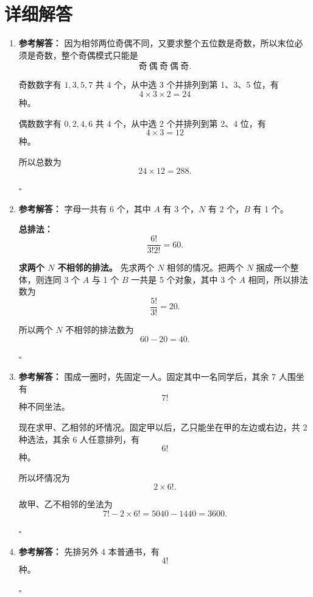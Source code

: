 \documentclass[11pt,a4paper,fontset=fandol]{ctexart}
\newenvironment{solution}{\par\noindent\textbf{参考解答：}}{\hfill$\square$\par}
\begin{document}
\newpage
\section{详细解答}

\begin{enumerate}
  \item \begin{solution}
  因为相邻两位奇偶不同，又要求整个五位数是奇数，所以末位必须是奇数，整个奇偶模式只能是
  \[
  \text{奇}\ \text{偶}\ \text{奇}\ \text{偶}\ \text{奇}.
  \]

  奇数数字有 $1,3,5,7$ 共 4 个，从中选 3 个并排列到第 1、3、5 位，有
  \[
  4\times 3\times 2=24
  \]
  种。

  偶数数字有 $0,2,4,6$ 共 4 个，从中选 2 个并排列到第 2、4 位，有
  \[
  4\times 3=12
  \]
  种。

  所以总数为
  \[
  24\times 12=288.
  \]

  \end{solution}

  \item \begin{solution}
  字母一共有 6 个，其中 $A$ 有 3 个，$N$ 有 2 个，$B$ 有 1 个。

  \textbf{总排法：}
  \[
  \frac{6!}{3!2!}=60.
  \]

  \textbf{求两个 $N$ 不相邻的排法。}  
  先求两个 $N$ 相邻的情况。把两个 $N$ 捆成一个整体，则连同 3 个 $A$ 与 1 个 $B$ 一共是 5 个对象，其中 3 个 $A$ 相同，所以排法数为
  \[
  \frac{5!}{3!}=20.
  \]

  所以两个 $N$ 不相邻的排法数为
  \[
  60-20=40.
  \]

  \end{solution}

  \item \begin{solution}
  围成一圈时，先固定一人。固定其中一名同学后，其余 7 人围坐有
  \[
  7!
  \]
  种不同坐法。

  现在求甲、乙相邻的坏情况。固定甲以后，乙只能坐在甲的左边或右边，共 2 种选法，其余 6 人任意排列，有
  \[
  6!
  \]
  种。

  所以坏情况为
  \[
  2\times 6!.
  \]

  故甲、乙不相邻的坐法为
  \[
  7!-2\times 6!=5040-1440=3600.
  \]

  \end{solution}

  \item \begin{solution}
  先排另外 4 本普通书，有
  \[
  4!
  \]
  种。


\end{solution}
\end{enumerate}
\end{document}
